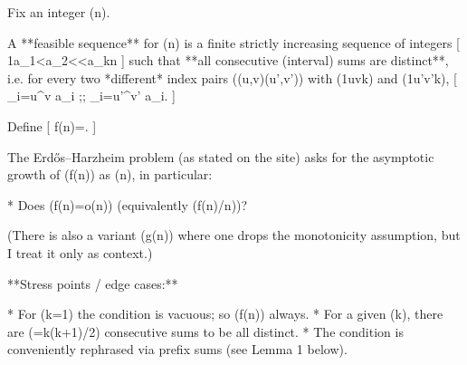 Fix an integer (n).

A **feasible sequence** for (n) is a finite strictly increasing sequence of integers
[
1\le a_1<a_2<\cdots<a_k\le n
]
such that **all consecutive (interval) sums are distinct**, i.e. for every two *different* index pairs ((u,v)\neq(u',v')) with (1\le u\le v\le k) and (1\le u'\le v'\le k),
[
\sum_{i=u}^{v} a_i ;\neq; \sum_{i=u'}^{v'} a_i.
]

Define
[
f(n)=.
]

The Erdős–Harzheim problem (as stated on the site) asks for the asymptotic growth of (f(n)) as (n\to\infty), in particular:

* Does (f(n)=o(n)) (equivalently (f(n)/n))?

(There is also a variant (g(n)) where one drops the monotonicity assumption, but I treat it only as context.)

**Stress points / edge cases:**

* For (k=1) the condition is vacuous; so (f(n)) always.
* For a given (k), there are (=k(k+1)/2) consecutive sums to be all distinct.
* The condition is conveniently rephrased via prefix sums (see Lemma 1 below).
